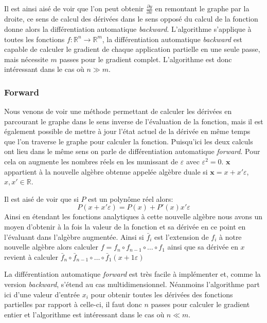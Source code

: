 Il est ainsi aisé de voir que l'on peut obtenir $\frac{\partial y}{\partial x}$ en remontant le graphe par la droite, ce sens de calcul des dérivées dans le sens opposé du calcul de la fonction donne alors la différentiation automatique \emph{backward}. L'algorithme s'applique à toutes les fonctions $f : \mathbb{R}^n \rightarrow \mathbb{R}^m $, la différentiation automatique \emph{backward} est capable de calculer le gradient de chaque application partielle en une seule passe, mais nécessite $m$ passes pour le gradient complet. L'algorithme est donc intéressant dans le cas où $n \gg m$.


\subsubsection{Forward}

Nous venons de voir une méthode permettant de calculer les dérivées en parcourant le graphe dans le sens inverse de l'évaluation de la fonction, mais il est également possible de mettre à jour l'état actuel de la dérivée en même temps que l'on traverse le graphe pour calculer la fonction. Puisqu'ici les deux calculs ont lieu dans le même sens on parle de différentiation automatique \emph{forward}.
Pour cela on augmente les nombres réels en les munissant de $\varepsilon$ avec $\varepsilon^2 = 0$. $\mathbf{x}$ appartient à la nouvelle algèbre obtenue appelée algèbre duale si $\mathbf{x} = x + x' \varepsilon$, $x,x' \in \mathbb{R}$.

Il est aisé de voir que si $P$ est un polynôme réel alors:
\begin{equation*}
    P(x+x' \varepsilon) = P(x) + P'(x) x' \varepsilon
\end{equation*}
Ainsi en étendant les fonctions analytiques à cette nouvelle algèbre nous avons un moyen d'obtenir à la fois la valeur de la fonction et sa dérivée en ce point en l'évaluant dans l'algèbre augmentée. Ainsi si $\bar{f}_i$ est l'extension de $f_i$ à notre nouvelle algèbre alors calculer $f = f_n \circ f_{n-1} \circ \dotsc \circ f_1$ ainsi que sa dérivée en $x$ revient à calculer $\bar{f}_n \circ \bar{f}_{n-1} \circ \dotsc \circ \bar{f}_1 ( x + 1 \varepsilon )$

La différentiation automatique \emph{forward} est très facile à implémenter et, comme la version \emph{backward}, s'étend au cas multidimensionnel. Néanmoins l'algorithme part ici d'une valeur d'entrée $x_i$ pour obtenir toutes les dérivées des fonctions partielles par rapport à celle-ci, il faut donc $n$ passes pour calculer le gradient entier et l'algorithme est intéressant dans le cas où $n \ll m$.
